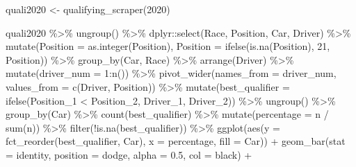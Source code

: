 \documentclass[
]{book}
\newenvironment{Shaded}{\begin{snugshade}}{\end{snugshade}}
\newcommand{\AttributeTok}[1]{\textcolor[rgb]{0.77,0.63,0.00}{#1}}
\newcommand{\DecValTok}[1]{\textcolor[rgb]{0.00,0.00,0.81}{#1}}
\newcommand{\FloatTok}[1]{\textcolor[rgb]{0.00,0.00,0.81}{#1}}
\newcommand{\FunctionTok}[1]{\textcolor[rgb]{0.00,0.00,0.00}{#1}}
\newcommand{\NormalTok}[1]{#1}
\newcommand{\OtherTok}[1]{\textcolor[rgb]{0.56,0.35,0.01}{#1}}
\newcommand{\SpecialCharTok}[1]{\textcolor[rgb]{0.00,0.00,0.00}{#1}}
\newcommand{\StringTok}[1]{\textcolor[rgb]{0.31,0.60,0.02}{#1}}
\begin{document}
\begin{Shaded}
\begin{Highlighting}[]
\NormalTok{quali2020 }\OtherTok{\textless{}{-}} \FunctionTok{qualifying\_scraper}\NormalTok{(}\DecValTok{2020}\NormalTok{)}

\NormalTok{quali2020 }\SpecialCharTok{\%\textgreater{}\%}
  \FunctionTok{ungroup}\NormalTok{() }\SpecialCharTok{\%\textgreater{}\%}
\NormalTok{  dplyr}\SpecialCharTok{::}\FunctionTok{select}\NormalTok{(Race, Position, Car, Driver) }\SpecialCharTok{\%\textgreater{}\%}
  \FunctionTok{mutate}\NormalTok{(}\AttributeTok{Position =} \FunctionTok{as.integer}\NormalTok{(Position),}
         \AttributeTok{Position =} \FunctionTok{ifelse}\NormalTok{(}\FunctionTok{is.na}\NormalTok{(Position), }\DecValTok{21}\NormalTok{, Position)) }\SpecialCharTok{\%\textgreater{}\%} 
  \FunctionTok{group\_by}\NormalTok{(Car, Race) }\SpecialCharTok{\%\textgreater{}\%} 
  \FunctionTok{arrange}\NormalTok{(Driver) }\SpecialCharTok{\%\textgreater{}\%} 
  \FunctionTok{mutate}\NormalTok{(}\AttributeTok{driver\_num =} \DecValTok{1}\SpecialCharTok{:}\FunctionTok{n}\NormalTok{()) }\SpecialCharTok{\%\textgreater{}\%} 
  \FunctionTok{pivot\_wider}\NormalTok{(}\AttributeTok{names\_from =} \StringTok{\textquotesingle{}driver\_num\textquotesingle{}}\NormalTok{, }\AttributeTok{values\_from =} \FunctionTok{c}\NormalTok{(}\StringTok{\textquotesingle{}Driver\textquotesingle{}}\NormalTok{, }\StringTok{\textquotesingle{}Position\textquotesingle{}}\NormalTok{)) }\SpecialCharTok{\%\textgreater{}\%}
  \FunctionTok{mutate}\NormalTok{(}\AttributeTok{best\_qualifier =} \FunctionTok{ifelse}\NormalTok{(Position\_1 }\SpecialCharTok{\textless{}}\NormalTok{ Position\_2, Driver\_1, Driver\_2)) }\SpecialCharTok{\%\textgreater{}\%}
  \FunctionTok{ungroup}\NormalTok{() }\SpecialCharTok{\%\textgreater{}\%}
  \FunctionTok{group\_by}\NormalTok{(Car) }\SpecialCharTok{\%\textgreater{}\%}
  \FunctionTok{count}\NormalTok{(best\_qualifier) }\SpecialCharTok{\%\textgreater{}\%}
  \FunctionTok{mutate}\NormalTok{(}\AttributeTok{percentage =}\NormalTok{ n }\SpecialCharTok{/} \FunctionTok{sum}\NormalTok{(n)) }\SpecialCharTok{\%\textgreater{}\%}
  \FunctionTok{filter}\NormalTok{(}\SpecialCharTok{!}\FunctionTok{is.na}\NormalTok{(best\_qualifier)) }\SpecialCharTok{\%\textgreater{}\%}
  \FunctionTok{ggplot}\NormalTok{(}\FunctionTok{aes}\NormalTok{(}\AttributeTok{y =} \FunctionTok{fct\_reorder}\NormalTok{(best\_qualifier, Car), }\AttributeTok{x =}\NormalTok{ percentage, }\AttributeTok{fill =}\NormalTok{ Car)) }\SpecialCharTok{+}
  \FunctionTok{geom\_bar}\NormalTok{(}\AttributeTok{stat =} \StringTok{\textquotesingle{}identity\textquotesingle{}}\NormalTok{, }\AttributeTok{position =} \StringTok{\textquotesingle{}dodge\textquotesingle{}}\NormalTok{, }\AttributeTok{alpha =} \FloatTok{0.5}\NormalTok{, }\AttributeTok{col =} \StringTok{\textquotesingle{}black\textquotesingle{}}\NormalTok{) }\SpecialCharTok{+}

\end{Highlighting}
\end{Shaded}
\end{document}
